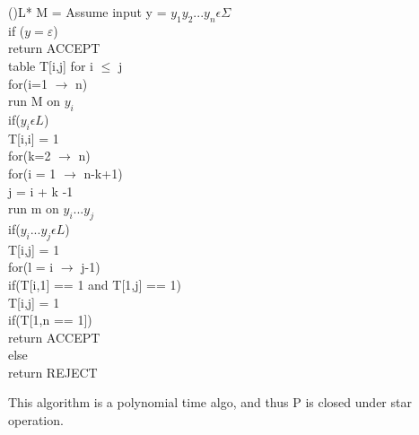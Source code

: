 \documentclass[12pt]{article}
\begin{document}
\begin{algorithm}[H]
    \Fn(){L*}{
    \SetAlgoLined
    \SetNoFillComment
    \DontPrintSemicolon
    M = Assume input y = $y_1y_2 ... y_n \epsilon \Sigma$\\
        if ($y = \varepsilon$){\\
            \hspace{0.5cm}return ACCEPT \\
        } 
        table T[i,j] for i $\leq$ j\\
        for(i=1 $\rightarrow$ n){\\
            \hspace{0.5cm}run M on $y_i$\\
            \hspace{0.5cm}if($y_i \epsilon L$){\\
                \hspace{1cm}T[i,i] = 1\\
            }
        }
        for(k=2 $\rightarrow$ n){\\
            \hspace{0.5cm}for(i = 1 $\rightarrow$ n-k+1){\\
                \hspace{1cm}j = i + k -1\\
                \hspace{1cm}run m on $y_i ... y_j$\\
                \hspace{1cm}if($y_i ... y_j \epsilon L$){\\
                    \hspace{1.5cm}T[i,j] = 1\\}
                \hspace{1cm}for(l = i $\rightarrow$ j-1){\\
                    \hspace{1.5cm}if(T[i,1] == 1 and T[1,j] == 1){\\
                        \hspace{2cm}T[i,j] = 1\\
                    }
                }
            }
        }
        if(T[1,n == 1]){\\
            \hspace{0.5cm}return ACCEPT \\
        }
        else{\\
            \hspace{0.5cm}return REJECT
        }
    }
    \end{algorithm}
    This algorithm is a polynomial time algo, and thus P is closed under star operation. 
\bigskip
\end{document}
